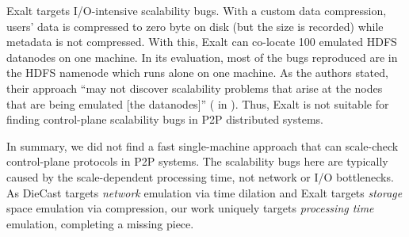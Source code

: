 Exalt \cite{Wang+14-Exalt} targets I/O-intensive scalability bugs.  With a
custom data compression, users' data is compressed to zero byte on disk (but the
size is recorded) while metadata is not compressed.  With this, Exalt can
co-locate 100 emulated HDFS datanodes on one machine.  In its evaluation, most
of the bugs reproduced are in the HDFS namenode which runs alone on one machine.
As the authors stated, their approach ``may not discover scalability problems
that arise at the nodes that are being emulated [the datanodes]'' ( in
\cite{Wang+14-Exalt}).  Thus, Exalt is not suitable for finding control-plane
scalability bugs in P2P distributed systems.

In summary, we did not find a fast single-machine approach that can scale-check
control-plane protocols in P2P systems.  The scalability bugs here are
typically caused by the scale-dependent processing time, not network or I/O
bottlenecks.  As DieCast targets {\em network} emulation via time dilation and
Exalt targets {\em storage} space emulation via compression, our work uniquely
targets {\em processing time} emulation, completing a missing piece.
\fi

